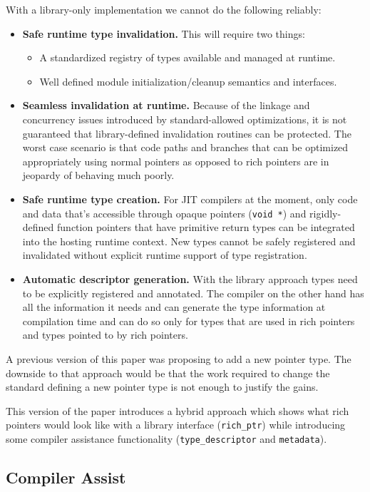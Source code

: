 With a library-only implementation we cannot do the following reliably:

\begin{itemize}

  \item \textbf{Safe runtime type invalidation.} This will require two things:

  \begin{itemize}

   \item A standardized registry of types available and managed at runtime.

   \item Well defined module initialization/cleanup semantics and interfaces.

  \end{itemize}

  \item \textbf{Seamless invalidation at runtime.} Because of the linkage and
  concurrency issues introduced by standard-allowed optimizations, it is not
  guaranteed that library-defined invalidation routines can be protected. The
  worst case scenario is that code paths and branches that can be optimized
  appropriately using normal pointers as opposed to rich pointers are in
  jeopardy of behaving much poorly.

  \item \textbf{Safe runtime type creation.} For JIT compilers at the moment,
  only code and data that’s accessible through opaque pointers (\verb+void *+)
  and rigidly-defined function pointers that have primitive return types can
  be integrated into the hosting runtime context. New types cannot be safely
  registered and invalidated without explicit runtime support of type
  registration.

  \item \textbf{Automatic descriptor generation.} With the library approach
  types need to be explicitly registered and annotated. The compiler on the
  other hand has all the information it needs and can generate the type
  information at compilation time and can do so only for types that are used
  in rich pointers and types pointed to by rich pointers.

\end{itemize}

A previous version of this paper was proposing to add a new pointer type. The downside to that approach would be that the work required to change the standard defining a new pointer type is not enough to justify the gains.

This version of the paper introduces a hybrid approach which shows what rich pointers would look like with a library interface (\verb+rich_ptr+) while introducing some compiler assistance functionality (\verb+type_descriptor+ and \verb+metadata+).

\subsection{Compiler Assist}